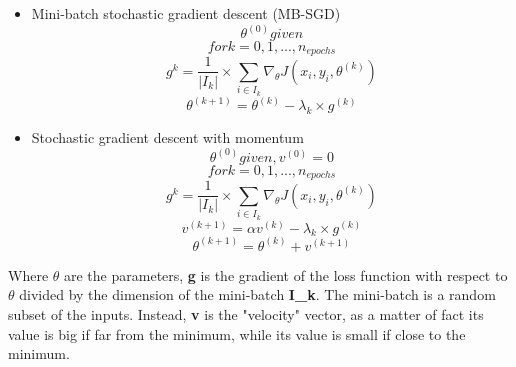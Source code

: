 \documentclass{article}
\begin{document}
\begin{itemize}
    \item Mini-batch stochastic gradient descent (MB-SGD)
    \begin{equation}\nonumber
        \theta^{(0)} given
    \end{equation}
    \begin{equation}\nonumber
        for k = 0,1,...,n_{epochs}
    \end{equation}
    \begin{equation}\nonumber
        g^{k} = \frac{1}{|I_k|} \times \sum_{i \in I_k} \nabla_{\theta} J(x_i , y_i , \theta^{(k)})
    \end{equation}
    \begin{equation}\nonumber
        \theta^{(k+1)} = \theta^{(k)} - \lambda_k \times g^{(k)}
    \end{equation}
    
    \item Stochastic gradient descent with momentum
    \begin{equation}\nonumber
        \theta^{(0)} given , v^{(0)} = 0
    \end{equation}
    \begin{equation}\nonumber
        for k = 0,1,...,n_{epochs}
    \end{equation}
    \begin{equation}\nonumber
        g^{k} = \frac{1}{|I_k|} \times \sum_{i \in I_k} \nabla_{\theta} J(x_i , y_i , \theta^{(k)})
    \end{equation}
    \begin{equation}\nonumber
        v^{(k+1)} = \alpha v^{(k)} - \lambda_k \times g^{(k)}
    \end{equation}
    \begin{equation}\nonumber
        \theta^{(k+1)} = \theta^{(k)} +  v^{(k+1)}
    \end{equation}
\end{itemize}

Where ${\theta}$ are the parameters, \textbf{g} is the gradient of the loss function with respect to ${\theta}$ divided by the dimension of the mini-batch \textbf{I_{k}}. \newline The mini-batch is a random subset of the inputs. Instead, \textbf{v} is the "velocity" vector, as a matter of fact its value is big if far from the minimum, while its value is small if close to the minimum.
\end{document}
